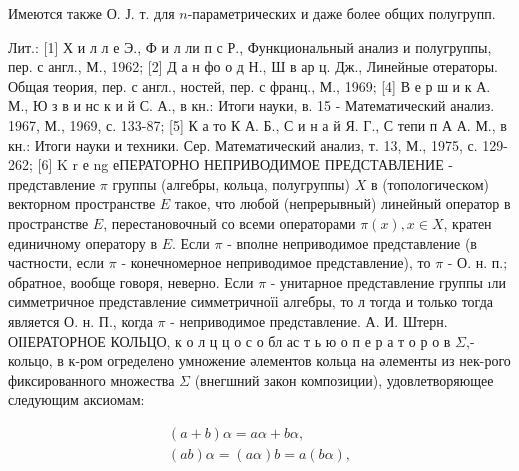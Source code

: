 \documentclass[10pt]{article}
\begin{document}
Имеются также О. Ј. т. для $n$-параметрических и даже более общих полугрупп.

Лит.: [1] Х и л л е Э., Ф и л ли п с Р., Функциональный анализ и полугруппы, пер. с англ., М., 1962; [2] Д а н фо о д Н., Ш в ар ц. Дж., Линейные отераторы. Общая теория, пер. с англ., ностей, пер. с франц., М., 1969; [4] В е р ш и к А. М., Ю з в и нс к и й С. А., в кн.: Итоги науки, в. 15 - Математический анализ. 1967, М., 1969, с. 133-87; [5] К а то К А. Б., С и н а й Я. Г., С тепи п А А. М., в кн.: Итоги науки и техники. Сер. Математический анализ, т. 13, М., 1975, с. 129-262; [6] K r е ng еПЕРАТОРНО НЕПРИВОДИМОЕ ПРЕДСТАВЛЕНИЕ - представление $\pi$ группы (алгебры, кольца, полугруппы) $X$ в (топологическом) векторном пространстве $E$ такое, что любой (непрерывный) линейный оператор в пространстве $E$, перестановочный со всеми операторами $\pi(x), x \in X$, кратен единичному оператору в $E$. Если $\pi$ - вполне неприводимое представление (в частности, если $\pi$ - конечномерное неприводимое представление), то $\pi$ - О. н. п.; обратное, вообще говоря, неверно. Если $\pi$ - унитарное представление группы ıли симметричное представление симметричноїі алгебры, то л тогда и только тогда является О. н. П., когда $\pi$ - неприводимое представление. А. И. Штерн. ОІІЕРАТОРНОЕ КОЛЬЦО, к о л ц ц о с о бл ас т ь ю о п е р а т о р о в $\Sigma$,- кольцо, в к-ром огределено умножение әлементов кольца на әлементы из нек-рого фиксированного множества $\Sigma$ (внегшний закон композиции), удовлетворяющее следующим аксиомам:

\[
\begin{gathered}
(a+b) \alpha=a \alpha+b \alpha, \\
(a b) \alpha=(a \alpha) b=a(b \alpha),
\end{gathered}
\]
\end{document}
